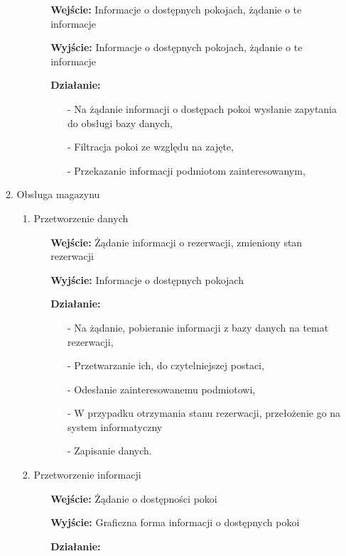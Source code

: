 \documentclass[a4paper, 11pt]{article}
\begin{document}
\begin{enumerate}[label*=\arabic*.]
\begin{enumerate}[label*=\arabic*.]
\begin{enumerate}[label*=\arabic*.]
\begin{itemize}
					\item[\textbf{Wejście:}] Informacje o dostępnych pokojach, żądanie o te informacje
					\item[\textbf{Wyjście:}] Informacje o dostępnych pokojach, żądanie o te informacje
					\item[\textbf{Działanie:}] 
					\begin{itemize}
						\item[-] Na żądanie informacji o dostępach pokoi wysłanie zapytania do obsługi bazy danych,
						\item[-] Filtracja pokoi ze względu na zajęte,
						\item[-] Przekazanie informacji podmiotom zainteresowanym,
					\end{itemize}														
				\end{itemize}	
			\end{enumerate}
			\item Obsługa magazynu
			\begin{enumerate}[label*=\arabic*.]
				\item Przetworzenie danych
				\begin{itemize}
					\item[\textbf{Wejście:}] Żądanie informacji o rezerwacji, zmieniony stan rezerwacji
					\item[\textbf{Wyjście:}] Informacje o dostępnych pokojach
					\item[\textbf{Działanie:}] 
					\begin{itemize}
						\item[-] Na żądanie, pobieranie informacji z bazy danych na temat rezerwacji,
						\item[-] Przetwarzanie ich, do czytelniejszej postaci,
						\item[-] Odesłanie zainteresowanemu podmiotowi,
						\item[-] W przypadku otrzymania stanu rezerwacji, przełożenie go na system informatyczny
						\item[-] Zapisanie danych.
					\end{itemize}														
				\end{itemize}	
				\item Przetworzenie informacji
				\begin{itemize}
					\item[\textbf{Wejście:}] Żądanie o dostępności pokoi
					\item[\textbf{Wyjście:}] Graficzna forma informacji o dostępnych pokoi
					\item[\textbf{Działanie:}]

\end{itemize}
\end{enumerate}
\end{enumerate}
\end{enumerate}
\end{document}
